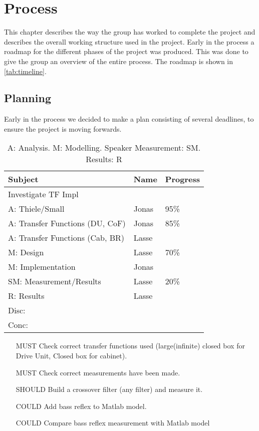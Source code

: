 
\chapter{Process}
This chapter describes the way the group has worked to complete the project and describes the overall working structure used in the project.
Early in the process a roadmap for the different phases of the project was produced. This was done to give the group an overview of the entire process. The roadmap is shown in \cref{tab:timeline}.

\section{Planning}
Early in the process we decided to make a plan consisting of several deadlines, to ensure the project is moving forwards.

\begin{table}
	\begin{tabularx}{\textwidth}{l X X}
		\toprule
		\textbf{Subject} & \textbf{Name} & \textbf{Progress} \\
		\midrule
		Investigate TF Impl & & \\
		A: Thiele/Small & Jonas & 95\% \\
		A: Transfer Functions (DU, CoF) & Jonas & 85\%\\
		A: Transfer Functions (Cab, BR) & Lasse & \\
		M: Design & Lasse & 70\% \\
		M: Implementation & Jonas & \\
		SM: Measurement/Results & Lasse & 20\% \\
		R: Results & Lasse & \\
		Disc: & & \\
		Conc: & & \\
		\bottomrule
	\end{tabularx}
	\caption{A: Analysis. M: Modelling. Speaker Measurement: SM. Results: R}
\end{table}

\begin{itemize}
	\item[MUST] Check correct transfer functions used (large(infinite) closed box for Drive Unit, Closed box for cabinet).
	\item[MUST] Check correct measurements have been made.
	\item[SHOULD] Build a crossover filter (any filter) and measure it.
	\item[COULD] Add bass reflex to Matlab model.
	\item[COULD] Compare bass reflex measurement with Matlab model
\end{itemize}